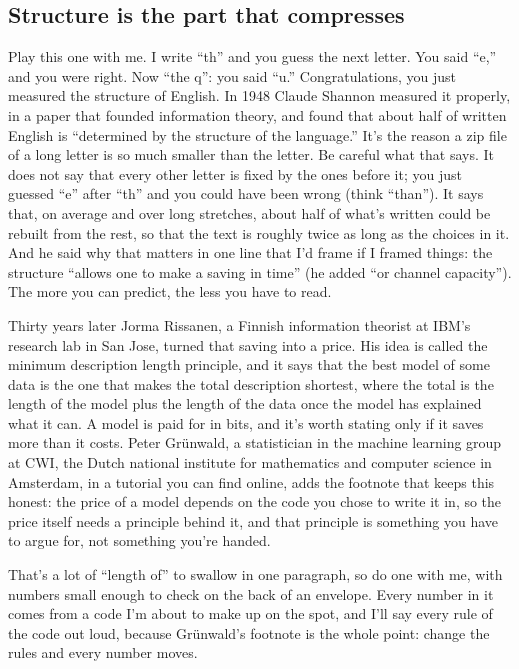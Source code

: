 \documentclass[11pt,twoside]{article}
\theoremstyle{thielethm}
\theoremstyle{thieledef}
\theoremstyle{thieledef}
\theoremstyle{thieledef}
\theoremstyle{thielethm}
\theoremstyle{thieleobs}
\theoremstyle{thielethm}
\begin{document}
\subsection{Structure is the part that compresses}

Play this one with me. I write ``th'' and you guess the next letter. You said ``e,'' and you were right. Now ``the q'': you said ``u.'' Congratulations, you just measured the structure of English. In 1948 Claude Shannon measured it properly, in a paper that founded information theory, and found that about half of written English is ``determined by the structure of the language.'' It's the reason a zip file of a long letter is so much smaller than the letter. Be careful what that says. It does not say that every other letter is fixed by the ones before it; you just guessed ``e'' after ``th'' and you could have been wrong (think ``than''). It says that, on average and over long stretches, about half of what's written could be rebuilt from the rest, so that the text is roughly twice as long as the choices in it. And he said why that matters in one line that I'd frame if I framed things: the structure ``allows one to make a saving in time'' (he added ``or channel capacity''). The more you can predict, the less you have to read.

Thirty years later Jorma Rissanen, a Finnish information theorist at IBM's research lab in San Jose, turned that saving into a price. His idea is called the minimum description length principle, and it says that the best model of some data is the one that makes the total description shortest, where the total is the length of the model plus the length of the data once the model has explained what it can. A model is paid for in bits, and it's worth stating only if it saves more than it costs. Peter Grünwald, a statistician in the machine learning group at CWI, the Dutch national institute for mathematics and computer science in Amsterdam, in a tutorial you can find online, adds the footnote that keeps this honest: the price of a model depends on the code you chose to write it in, so the price itself needs a principle behind it, and that principle is something you have to argue for, not something you're handed.

That's a lot of ``length of'' to swallow in one paragraph, so do one with me, with numbers small enough to check on the back of an envelope. Every number in it comes from a code I'm about to make up on the spot, and I'll say every rule of the code out loud, because Grünwald's footnote is the whole point: change the rules and every number moves.
\end{document}
